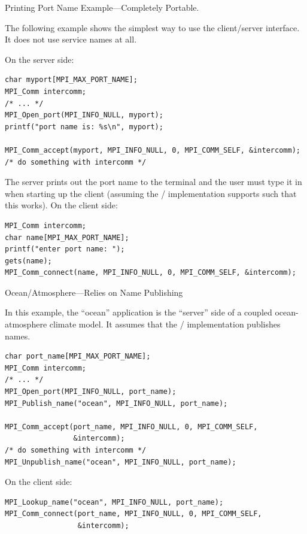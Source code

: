 \begin{example}
%
Printing Port Name Example---Completely Portable.

\noindent
The following example shows the simplest way to use
the client/server interface. It does not use service
names at all.

\noindent
On the server side:
\begin{lstlisting}[language={[MPI]C}]
char myport[MPI_MAX_PORT_NAME];
MPI_Comm intercomm;
/* ... */
MPI_Open_port(MPI_INFO_NULL, myport);
printf("port name is: %s\n", myport);

MPI_Comm_accept(myport, MPI_INFO_NULL, 0, MPI_COMM_SELF, &intercomm);
/* do something with intercomm */
\end{lstlisting}
The server prints out the port name to the terminal and the user
must type it in when starting up the client (assuming the \MPI/
implementation supports  such that this works).
On the client side:
\begin{lstlisting}[language={[MPI]C}]
MPI_Comm intercomm;
char name[MPI_MAX_PORT_NAME];
printf("enter port name: ");
gets(name);
MPI_Comm_connect(name, MPI_INFO_NULL, 0, MPI_COMM_SELF, &intercomm);
\end{lstlisting}
\end{example}

\begin{example}
%
Ocean/Atmosphere---Relies on Name Publishing

\noindent

In this example, the ``ocean'' application is the ``server''
side of a coupled ocean-atmosphere climate model. It assumes
that the \MPI/ implementation publishes names.

\begin{lstlisting}[language={[MPI]C}]
char port_name[MPI_MAX_PORT_NAME];
MPI_Comm intercomm;
/* ... */
MPI_Open_port(MPI_INFO_NULL, port_name);
MPI_Publish_name("ocean", MPI_INFO_NULL, port_name);

MPI_Comm_accept(port_name, MPI_INFO_NULL, 0, MPI_COMM_SELF,
                &intercomm);
/* do something with intercomm */
MPI_Unpublish_name("ocean", MPI_INFO_NULL, port_name);
\end{lstlisting}
On the client side:
\begin{lstlisting}[language={[MPI]C}]
MPI_Lookup_name("ocean", MPI_INFO_NULL, port_name);
MPI_Comm_connect(port_name, MPI_INFO_NULL, 0, MPI_COMM_SELF,
                 &intercomm);
\end{lstlisting}
\end{example}

